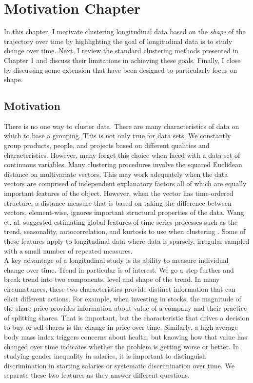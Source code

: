 \chapter{Motivation Chapter}

 In this chapter, I motivate clustering longitudinal data based on the {\em shape} of the trajectory over time by highlighting the goal of longitudinal data is to study change over time. Next, I review the standard clustering methods presented in Chapter 1 and discuss their limitations in achieving these goals. Finally, I close by discussing some extension that have been designed to particularly focus on shape.

\section{Motivation}
There is no one way to cluster data. There are many characteristics of data on which to base a grouping. This is not only true for data sets. We constantly group products, people, and projects based on different qualities and characteristics. However, many forget this choice when faced with a data set of continuous variables. Many clustering procedures involve the squared Euclidean distance on multivariate vectors. This may work adequately when the data vectors are comprised of independent explanatory factors all of which are equally important features of the object. However, when the vector has time-ordered structure, a distance measure that is based on taking the difference between vectors, element-wise, ignores important structural properties of the data. Wang et. al. suggested estimating global features of time series processes such as the trend, seasonality, autocorrelation, and kurtosis to use when clustering \cite{wang2006}. Some of these features apply to longitudinal data where data is sparsely, irregular sampled with a small number of repeated measures. \\

A key advantage of a longitudinal study is its ability to measure individual change over time. Trend in particular is of interest. We go a step further and break trend into two components, level and shape of the trend. In many circumstances, these two characteristics provide distinct information that can elicit different actions. For example, when investing in stocks, the magnitude of the share price provides information about value of a company and their practice of splitting shares. That is important, but the characteristic that drives a decision to buy or sell shares is the change in price over time. Similarly, a high average body mass index triggers concerns about health, but knowing how that value has changed over time indicates whether the problem is getting worse or better. In studying gender inequality in salaries, it is important to distinguish discrimination in starting salaries or systematic discrimination over time. We separate these two features as they answer different questions. \\


